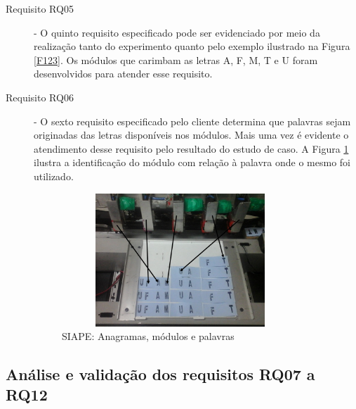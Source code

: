 \documentclass[10pt,letterpaper,twocolumn]{IEEEtran}
\begin{document}
\begin{description}
	\item[Requisito RQ05] - O quinto requisito especificado pode ser evidenciado por meio da realização tanto do experimento quanto pelo exemplo ilustrado na Figura \ref{F123}.  Os módulos que carimbam as letras A, F, M, T e U foram desenvolvidos para atender esse requisito.\par 
	
	\item[Requisito RQ06] - O sexto requisito especificado pelo cliente determina que palavras sejam originadas das letras disponíveis nos módulos. Mais uma vez é evidente o atendimento desse requisito pelo resultado do estudo de caso. A Figura \ref{F127} ilustra a identificação do módulo com relação à palavra onde o mesmo foi utilizado.
	
	
	\begin{figure}[h]
		\centering
		\includegraphics[width=8.9cm, height=5cm]{MeDSE_imagens/F127_SIAPE_AFMTU.jpg} 
		\caption{SIAPE: Anagramas, módulos e palavras}
		\label{F127}
	\end{figure}	
	
	
	
\end{description}					

\subsection{Análise e validação dos requisitos RQ07 a RQ12}	
\end{document}
